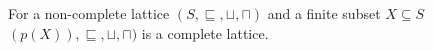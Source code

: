 \begin{theorem}
    For a non-complete lattice $(S, \sqsubseteq, \sqcup, \sqcap)$ and a finite subset $X \subseteq S$ $(p(X)), \sqsubseteq, \sqcup, \sqcap)$ is a complete lattice.
\end{theorem}














